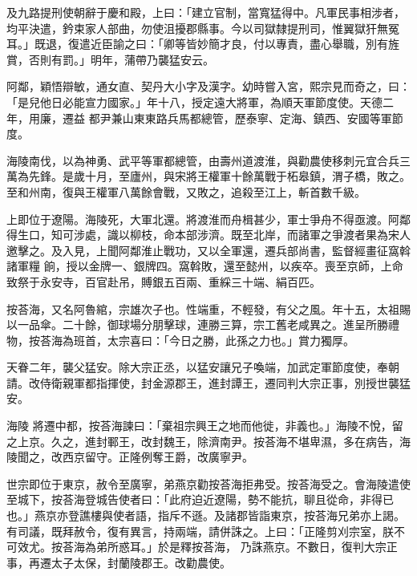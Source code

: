 \begin{pinyinscope}
 及九路提刑使朝辭于慶和殿，上曰：「建立官制，當寬猛得中。凡軍民事相涉者，均平決遣，鈐束家人部曲，勿使沮擾郡縣事。今以司獄隸提刑司，惟翼獄犴無冤耳。」既退，復遣近臣諭之曰：「卿等皆妙簡才良，付以專責，盡心舉職，別有旌賞，否則有罰。」明年，蒲帶乃襲猛安云。



 阿鄰，穎悟辯敏，通女直、契丹大小字及漢字。幼時嘗入宮，熙宗見而奇之，曰：「是兒他日必能宣力國家。」年十八，授定遠大將軍，為順天軍節度使。天德二年，用廉，遷益
 都尹兼山東東路兵馬都總管，歷泰寧、定海、鎮西、安國等軍節度。



 海陵南伐，以為神勇、武平等軍都總管，由壽州道渡淮，與勸農使移刺元宜合兵三萬為先鋒。是歲十月，至廬州，與宋將王權軍十餘萬戰于柘皋鎮，渭子橋，敗之。至和州南，復與王權軍八萬餘會戰，又敗之，追殺至江上，斬首數千級。



 上即位于遼陽。海陵死，大軍北還。將渡淮而舟楫甚少，軍士爭舟不得亟渡。阿鄰得生口，知可涉處，識以柳枝，命本部涉濟。既至北岸，而諸軍之爭渡者果為宋人邀擊之。及入見，上聞阿鄰淮止戰功，又以全軍還，遷兵部尚書，監督經畫征窩斡諸軍糧
 餉，授以金牌一、銀牌四。窩斡敗，還至懿州，以疾卒。喪至京師，上命致祭于永安寺，百官赴吊，賻銀五百兩、重綵三十端、絹百匹。



 按荅海，又名阿魯綰，宗雄次子也。性端重，不輕發，有父之風。年十五，太祖賜以一品傘。二十餘，御球場分朋擊球，連勝三算，宗工舊老咸異之。進呈所勝禮物，按荅海為班首，太宗喜曰：「今日之勝，此孫之力也。」賞力獨厚。



 天眷二年，襲父猛安。除大宗正丞，以猛安讓兄子喚端，加武定軍節度使，奉朝請。改侍衛親軍都指揮使，封金源郡王，進封譚王，遷同判大宗正事，別授世襲猛安。



 海陵
 將遷中都，按荅海諫曰：「棄祖宗興王之地而他徙，非義也。」海陵不悅，留之上京。久之，進封鄆王，改封魏王，除濟南尹。按荅海不堪卑濕，多在病告，海陵聞之，改西京留守。正隆例奪王爵，改廣寧尹。



 世宗即位于東京，赦令至廣寧，弟燕京勸按荅海拒弗受。按荅海受之。會海陵遣使至城下，按荅海登城告使者曰：「此府迫近遼陽，勢不能抗，聊且從命，非得已也。」燕京亦登譙樓與使者語，指斥不遜。及諸郡皆詣東京，按荅海兄弟亦上謁。有司議，既拜赦令，復有異言，持兩端，請併誅之。上曰：「正隆剪刈宗室，朕不可效尤。按荅海為弟所惑耳。」於是釋按荅海，
 乃誅燕京。不數日，復判大宗正事，再遷太子太保，封蘭陵郡王。改勸農使。




\end{pinyinscope}
